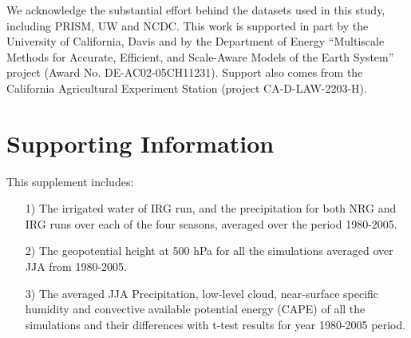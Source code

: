 %

We acknowledge the substantial effort behind the datasets used in this study, including PRISM, UW and NCDC. This work is supported in part by the University of California, Davis and by the Department of Energy ``Multiscale Methods for Accurate, Efficient, and Scale-Aware Models of the Earth System'' project (Award No. DE-AC02-05CH11231). Support also comes from the California Agricultural Experiment Station (project CA-D-LAW-2203-H).

\section{Supporting Information}

This supplement includes:

\begin{itemize}

\item[1)] The irrigated water of IRG run, and the precipitation for both NRG and IRG runs over each of the four seasons, averaged over the period 1980-2005. 

\item[2)] The geopotential height at 500 hPa for all the simulations averaged over JJA from 1980-2005.

\item[3)] The averaged JJA Precipitation, low-level cloud, near-surface specific humidity and convective available potential energy (CAPE) of all the simulations and their differences with t-test results for year 1980-2005 period.

\end{itemize}


